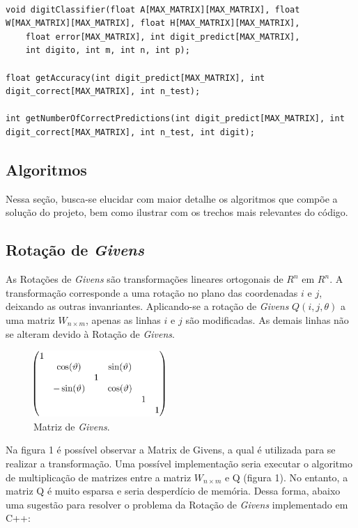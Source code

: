\documentclass[twocolumn,amsmath,amssymb,floatfix]{revtex4}
\begin{document}
\begin{lstlisting}

void digitClassifier(float A[MAX_MATRIX][MAX_MATRIX], float W[MAX_MATRIX][MAX_MATRIX], float H[MAX_MATRIX][MAX_MATRIX],
	float error[MAX_MATRIX], int digit_predict[MAX_MATRIX],
	int digito, int m, int n, int p);
	
float getAccuracy(int digit_predict[MAX_MATRIX], int digit_correct[MAX_MATRIX], int n_test);

int getNumberOfCorrectPredictions(int digit_predict[MAX_MATRIX], int digit_correct[MAX_MATRIX], int n_test, int digit);

\end{lstlisting}

\subsection{Algoritmos}

Nessa seção, busca-se elucidar com maior detalhe os algoritmos que compõe a solução do projeto, bem como ilustrar com os trechos mais relevantes do código.

\subsection{Rotação de \textit{Givens}}

As Rotações de \textit{Givens} são transformações lineares ortogonais de $R^n$ em $R^n$. A transformação corresponde a uma rotação no plano das coordenadas $i$ e $j$, deixando as outras invanriantes. Aplicando-se a rotação de \textit{Givens} $Q(i, j, \theta)$ a uma matriz $W_{n \times m}$, apenas as linhas $i$ e $j$ são modificadas. As demais linhas não se alteram devido à Rotação de \textit{Givens}.

\begin{figure}[h!]
  \centering
  \includegraphics[width=5cm]{GivensMatrix.png}
  \caption{Matriz de \textit{Givens}.}
\end{figure}

Na figura 1 é possível observar a Matrix de Givens, a qual é utilizada para se realizar a transformação. Uma possível implementação seria executar o algoritmo de multiplicação de matrizes entre a matriz $W_{n \times m}$ e Q (figura 1). No entanto, a matriz Q é muito esparsa e seria desperdício de memória. Dessa forma, abaixo uma sugestão para resolver o problema da Rotação de \textit{Givens} implementado em C++:
\end{document}
